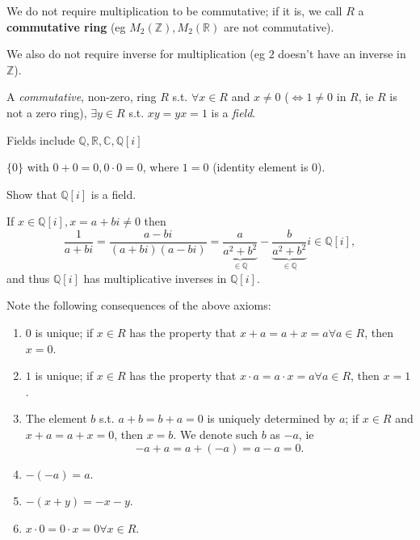 \documentclass[12pt,oneside]{article}
\begin{document}
\begin{remark}
  We do not require multiplication to be commutative; if it is, we call $R$ a \textbf{commutative ring} (eg $M_2(\mathbb{Z}), M_2(\mathbb{R})$ are not commutative).

  We also do not require inverse for multiplication (eg $2$ doesn't have an inverse in $\mathbb{Z}$).
\end{remark}

\begin{definition}[Field]
  A \emph{commutative}, non-zero, ring $R$  s.t. $\forall x \in R$ and $x \neq 0$ ($\iff 1 \neq 0 $ in $R$, ie $R$ is not a zero ring), $\exists y \in R$ s.t. $xy=yx=1$ is a \emph{field}.

  Fields include $\mathbb{Q}, \mathbb{R}, \mathbb{C}, \mathbb{Q}[i]$
\end{definition}

\begin{definition}
  $\{0\}$ with $0 + 0 = 0, 0 \cdot 0 = 0$, where $1 = 0$ (identity element is 0). 
\end{definition}

\begin{example}
  Show that $\mathbb{Q}[i]$ is a field.

  If $x \in \mathbb{Q}[i], x = a + b i \neq 0$ then \[\frac{1}{a+bi} = \frac{a-bi}{(a+bi)(a-bi)} = \underbrace{\frac{a}{a^2+b^2}}_{\in \mathbb{Q}} - \underbrace{\frac{b}{a^2+b^2}}_{\in \mathbb{Q}}i \in \mathbb{Q}[i],\] and thus $\mathbb{Q}[i]$ has multiplicative inverses in $\mathbb{Q}[i]$.
\end{example}

\begin{corollary}
  Note the following consequences of the above axioms:
  \begin{enumerate}
    \item $0$ is unique; if $x \in R$ has the property that $x + a = a+x = a \forall a \in R$, then $x = 0$.
    \item $1$ is unique; if $x \in R$ has the property that $x\cdot a = a \cdot x = a \forall a \in R$, then $x = 1$.
    \item The element $b$ s.t. $a+b = b+a = 0$ is uniquely determined by $a$; if $x \in R$ and $x + a = a+x = 0$, then $x = b$. We denote such $b$ as $-a$, ie \[-a + a = a+(-a) = a-a = 0.\]
    \item $-(-a)=a$.
    \item $-(x+y)=-x-y$.
    \item $x\cdot 0 = 0 \cdot x = 0 \forall x \in R$.
   \end{enumerate}
\end{corollary}
\end{document}
